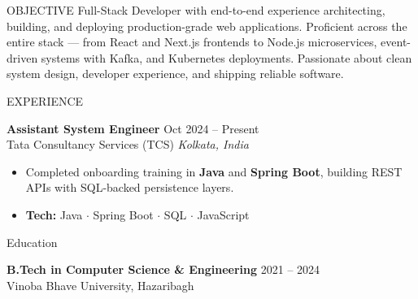 \documentclass{resume}
\begin{document}
\begin{rSection}{OBJECTIVE}
Full-Stack Developer with end-to-end experience architecting, building,
and deploying production-grade web applications. Proficient across the
entire stack --- from React and Next.js frontends to Node.js microservices,
event-driven systems with Kafka, and Kubernetes deployments.
Passionate about clean system design, developer experience, and shipping
reliable software.
\end{rSection}


\begin{rSection}{EXPERIENCE}

\textbf{Assistant System Engineer} \hfill Oct 2024 -- Present\\
Tata Consultancy Services (TCS) \hfill \textit{Kolkata, India}
\begin{itemize}
  \itemsep -3pt
  \item Completed onboarding training in \textbf{Java} and \textbf{Spring Boot},
        building REST APIs with SQL-backed persistence layers.
  \item \textbf{Tech:} Java \(\cdot\) Spring Boot \(\cdot\) SQL \(\cdot\) JavaScript
\end{itemize}

\end{rSection}


\begin{rSection}{Education}

{\bf B.Tech in Computer Science \& Engineering} \hfill {2021 -- 2024}\\
Vinoba Bhave University, Hazaribagh

\end{rSection}
\end{document}

